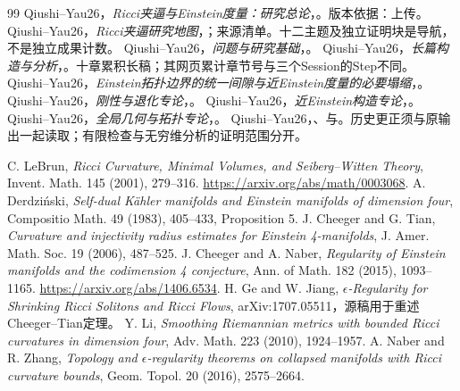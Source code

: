 \documentclass[UTF8,fontset=fandol,zihao=-4]{ctexart}
\theoremstyle{research}
\numberwithin{equation}{section}
\begin{document}
\begingroup\small
\begin{thebibliography}{99}
\setlength{\itemsep}{2pt}\setlength{\parskip}{0pt}\setlength{\parsep}{0pt}
 Qiushi--Yau26，\emph{Ricci夹逼与Einstein度量：研究总论}，。版本依据：上传。
 Qiushi--Yau26，\emph{Ricci夹逼研究地图}，；来源清单。十二主题及独立证明块是导航，不是独立成果计数。
 Qiushi--Yau26，\emph{问题与研究基础}，。
 Qiushi--Yau26，\emph{长篇构造与分析}，。十章累积长稿；其网页累计章节号与三个Session的Step不同。
 Qiushi--Yau26，\emph{Einstein拓扑边界的统一间隙与近Einstein度量的必要塌缩}，。
 Qiushi--Yau26，\emph{刚性与退化专论}，。
 Qiushi--Yau26，\emph{近Einstein构造专论}，。
 Qiushi--Yau26，\emph{全局几何与拓扑专论}，。
 Qiushi--Yau26，、与。历史更正须与原输出一起读取；有限检查与无穷维分析的证明范围分开。

 C. LeBrun, \emph{Ricci Curvature, Minimal Volumes, and Seiberg--Witten Theory}, Invent. Math. 145 (2001), 279--316. \url{https://arxiv.org/abs/math/0003068}.
 A. Derdziński, \emph{Self-dual Kähler manifolds and Einstein manifolds of dimension four}, Compositio Math. 49 (1983), 405--433, Proposition 5.
 J. Cheeger and G. Tian, \emph{Curvature and injectivity radius estimates for Einstein 4-manifolds}, J. Amer. Math. Soc. 19 (2006), 487--525.
 J. Cheeger and A. Naber, \emph{Regularity of Einstein manifolds and the codimension 4 conjecture}, Ann. of Math. 182 (2015), 1093--1165. \url{https://arxiv.org/abs/1406.6534}.
 H. Ge and W. Jiang, \emph{$\epsilon$-Regularity for Shrinking Ricci Solitons and Ricci Flows}, arXiv:1707.05511，源稿用于重述Cheeger--Tian定理。
 Y. Li, \emph{Smoothing Riemannian metrics with bounded Ricci curvatures in dimension four}, Adv. Math. 223 (2010), 1924--1957.
 A. Naber and R. Zhang, \emph{Topology and $\epsilon$-regularity theorems on collapsed manifolds with Ricci curvature bounds}, Geom. Topol. 20 (2016), 2575--2664.

\end{thebibliography}
\endgroup
\end{document}
